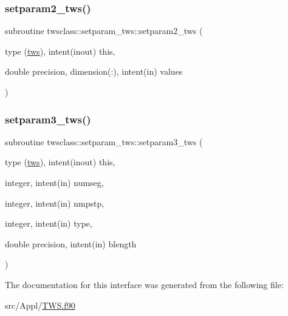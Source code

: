 \mbox{\label{interfacetwsclass_1_1setparam__tws_a00770665c096c8fe63394971beff2fa7}} 
\subsubsection{\texorpdfstring{setparam2\_tws()}{setparam2\_tws()}}
{\footnotesize\ttfamily subroutine twsclass\+::setparam\+\_\+tws\+::setparam2\+\_\+tws (\begin{DoxyParamCaption}\item[{type (\mbox{\hyperlink{namespacetwsclass_structtwsclass_1_1tws}{tws}}), intent(inout)}]{this,  }\item[{double precision, dimension(\+:), intent(in)}]{values }\end{DoxyParamCaption})}

\mbox{\label{interfacetwsclass_1_1setparam__tws_a89bd0a73883aa06198491ae13df4ecce}} 
\subsubsection{\texorpdfstring{setparam3\_tws()}{setparam3\_tws()}}
{\footnotesize\ttfamily subroutine twsclass\+::setparam\+\_\+tws\+::setparam3\+\_\+tws (\begin{DoxyParamCaption}\item[{type (\mbox{\hyperlink{namespacetwsclass_structtwsclass_1_1tws}{tws}}), intent(inout)}]{this,  }\item[{integer, intent(in)}]{numseg,  }\item[{integer, intent(in)}]{nmpstp,  }\item[{integer, intent(in)}]{type,  }\item[{double precision, intent(in)}]{blength }\end{DoxyParamCaption})}



The documentation for this interface was generated from the following file\+:\begin{DoxyCompactItemize}
\item 
src/\+Appl/\mbox{\hyperlink{_t_w_s_8f90}{T\+W\+S.\+f90}}\end{DoxyCompactItemize}
